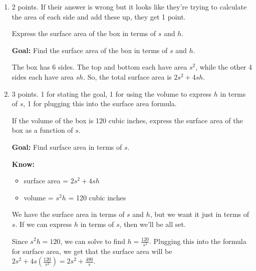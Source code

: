 \documentclass{article}
\begin{document}
\begin{enumerate}[resume]
\begin{enumerate}
  \item

    \begin{grading}
      2 points. If their answer is wrong but it looks like they're
      trying to calculate the area of each side and add these up, they
      get 1 point. 
    \end{grading}

    \begin{problem}[\vfill]
      Express the surface area of the box in terms of $s$ and $h$.
    \end{problem}

    \begin{solution}

      \textbf{Goal:} Find the surface area of the box in terms of $s$ and $h$. 

      The box has 6 sides. The top and bottom each have area $s^2$, 
      while the other 4 sides each have area $sh$. So, the total
      surface area is $\boxed{2s^2+4sh}$. 
    \end{solution} 

  \item

    \begin{grading}
      3 points. 1 for stating the goal, 1 for using the volume to express $h$ in terms of $s$, 1 for plugging this into the surface area formula.
    \end{grading}

    \begin{problem}[\nstretch{2}]
      If the volume of the box is 120 cubic inches, express the
      surface area of the box as a function of $s$.
    \end{problem}

    \begin{solution}

      \textbf{Goal:} Find surface area in terms of $s$.

      \textbf{Know:}
      \begin{itemize}
      \item surface area = $2s^2 + 4sh$
      \item volume = $s^2 h$ = 120 cubic inches
      \end{itemize}

      We have the surface area in terms of $s$ and $h$, but we want it
      just in terms of $s$. If we can express $h$ in terms of $s$, 
      then we'll be all set.

      Since $s^2 h = 120$, we can solve to find
      $\displaystyle h = \frac{120}{s^2}$. Plugging this into the
      formula for surface area, we get that the surface area will be
      $\displaystyle 2s^2 + 4s \left(\frac{120}{s^2}\right) = \boxed{2s^2 +
        \frac{480}{s}}$.
    \end{solution} 


\end{enumerate}
\end{enumerate}
\end{document}
